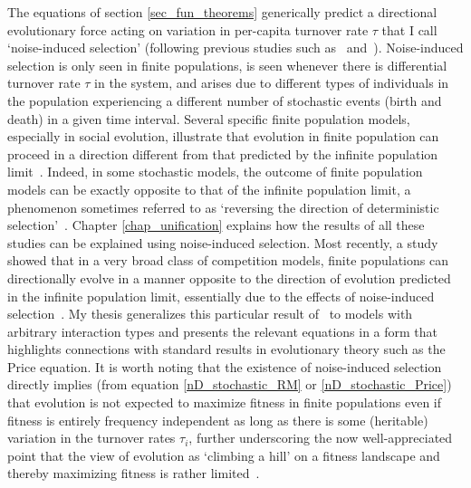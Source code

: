 The equations of section \ref{sec_fun_theorems} generically predict a directional evolutionary force acting on variation in per-capita turnover rate $\tau$ that I call `noise-induced selection' (following previous studies such as~\cite{constable_demographic_2016} and~\cite{week_white_2021}). Noise-induced selection is only seen in finite populations, is seen whenever there is differential turnover rate $\tau$ in the system, and arises due to different types of individuals in the population experiencing a different number of stochastic events (birth and death) in a given time interval. Several specific finite population models, especially in social evolution, illustrate that evolution in finite population can proceed in a direction different from that predicted by the infinite population limit~\citep{parsons_consequences_2010,melbinger_evolutionary_2010, houchmandzadeh_selection_2012, houchmandzadeh_fluctuation_2015,chotibut_evolutionary_2015,debarre_evolutionary_2016, behar_fluctuations-induced_2016, constable_demographic_2016,abu_awad_effects_2018,parsons_pathogen_2018,mcavoy_public_2018,mcleod_social_2019}. Indeed, in some stochastic models, the outcome of finite population models can be exactly opposite to that of the infinite population limit, a phenomenon sometimes referred to as `reversing the direction of deterministic selection'~\citep{constable_demographic_2016,mcleod_social_2019}. Chapter \ref{chap_unification} explains how the  results of all these studies can be explained using noise-induced selection. Most recently, a study showed that in a very broad class of competition models, finite populations can directionally evolve in a manner opposite to the direction of evolution predicted in the infinite population limit, essentially due to the effects of noise-induced selection~\citep{mazzolini_universality_2022}. My thesis generalizes this particular result of~\cite{mazzolini_universality_2022} to models with arbitrary interaction types and presents the relevant equations in a form that highlights connections with standard results in evolutionary theory such as the Price equation. It is worth noting that the existence of noise-induced selection directly implies (from equation \eqref{nD_stochastic_RM} or \eqref{nD_stochastic_Price}) that evolution is not expected to maximize fitness in finite populations even if fitness is entirely frequency independent as long as there is some (heritable) variation in the turnover rates $\tau_i$, further underscoring the now well-appreciated point that the view of evolution as `climbing a hill' on a fitness landscape and thereby maximizing fitness is rather limited~\citep{grodwohl_theory_2017}.

